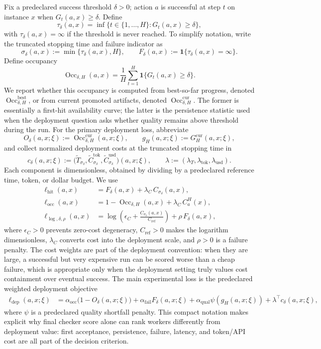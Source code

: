 \documentclass{article}
\DeclareMathOperator{\Occ}{Occ}
\newcommand{\one}{\mathbf{1}}
\begin{document}
Fix a predeclared success threshold $\delta>0$; action $a$ is successful at step $t$ on instance $x$ when $G_t(a,x)\ge\delta$.
Define
\[
\tau_\delta(a,x)=\inf\{t\in\{1,\ldots,H\}:G_t(a,x)\ge \delta\},
\]
with $\tau_\delta(a,x)=\infty$ if the threshold is never reached.
To simplify notation, write the truncated stopping time and failure indicator as
\[
\sigma_\delta(a,x):=\min\{\tau_\delta(a,x),H\},
\qquad
F_\delta(a,x):=\one\{\tau_\delta(a,x)=\infty\}.
\]
Define occupancy
\[
\Occ_{\delta,H}(a,x)=\frac{1}{H}\sum_{t=1}^H \one\{G_t(a,x)\ge \delta\}.
\]
We report whether this occupancy is computed from best-so-far progress, denoted $\Occ_{\delta,H}^{\mathrm{best}}$, or from current promoted artifacts, denoted $\Occ_{\delta,H}^{\mathrm{cur}}$.
The former is essentially a first-hit availability curve; the latter is the persistence statistic used when the deployment question asks whether quality remains above threshold during the run.
For the primary deployment loss, abbreviate
\[
O_\delta(a,x;\xi):=\Occ_{\delta,H}^{\mathrm{cur}}(a,x;\xi),
\qquad
g_H(a,x;\xi):=G_H^{\mathrm{cur}}(a,x;\xi),
\]
and collect normalized deployment costs at the truncated stopping time in
\[
c_\delta(a,x;\xi)
:=
\bigl(
\widetilde T_{\sigma_\delta},
\widetilde C^{\mathrm{tok}}_{\sigma_\delta},
\widetilde C^{\mathrm{usd}}_{\sigma_\delta}
\bigr)(a,x;\xi),
\qquad
\lambda:=(\lambda_T,\lambda_{\mathrm{tok}},\lambda_{\mathrm{usd}}).
\]
Each component is dimensionless, obtained by dividing by a predeclared reference time, token, or dollar budget.
We use
\begin{align}
\ell_{\mathrm{hit}}(a,x)
&= F_\delta(a,x)+\lambda_C\,C_{\sigma_\delta}(a,x),
\\
\ell_{\mathrm{occ}}(a,x)
&= 1-\Occ_{\delta,H}(a,x)+\lambda_C\,C_a^{H}(x),
\\
\ell_{\log,\delta,\rho}(a,x)
&=
\log\!\left(\epsilon_C+\frac{C_{\sigma_\delta}(a,x)}{C_{\mathrm{ref}}}\right)
+
\rho\,F_\delta(a,x),
\label{eq:log-effort-loss}
\end{align}
where $\epsilon_C>0$ prevents zero-cost degeneracy, $C_{\mathrm{ref}}>0$ makes the logarithm dimensionless, $\lambda_C$ converts cost into the deployment scale, and $\rho>0$ is a failure penalty.
The cost weights are part of the deployment convention: when they are large, a successful but very expensive run can be scored worse than a cheap failure, which is appropriate only when the deployment setting truly values cost containment over eventual success.
The main experimental loss is the predeclared weighted deployment objective
\begin{align}
\ell_{\mathrm{dep}}(a,x;\xi)
&=
\alpha_{\mathrm{occ}}\bigl(1-O_\delta(a,x;\xi)\bigr)
+\alpha_{\mathrm{fail}}F_\delta(a,x;\xi)
+\alpha_{\mathrm{qual}}\psi(g_H(a,x;\xi))
+\lambda^\top c_\delta(a,x;\xi),
\label{eq:deployment-loss}
\end{align}
where $\psi$ is a predeclared quality shortfall penalty.
This compact notation makes explicit why final checker score alone can rank workers differently from deployment value: first acceptance, persistence, failure, latency, and token/API cost are all part of the decision criterion.
\end{document}
